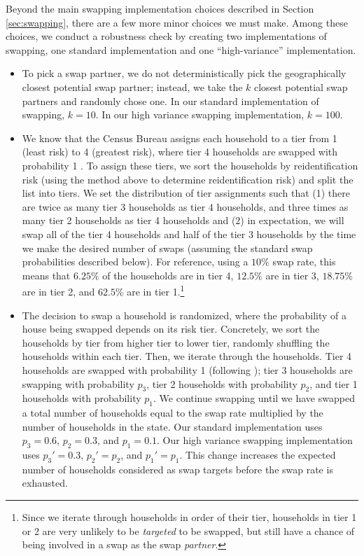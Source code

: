 Beyond the main swapping implementation choices described in Section \ref{sec:swapping}, there are a few more minor choices we must make. Among these choices, we conduct a robustness check by creating two implementations of swapping, one standard implementation and one ``high-variance'' implementation.
\begin{itemize}
    \item To pick a swap partner, we do not deterministically pick the geographically closest potential swap partner; instead, we take the $k$ closest potential swap partners and randomly chose one. In our standard implementation of swapping, $k=10$. In our high variance swapping implementation, $k=100$.
    \item We know that the Census Bureau assigns each household to a tier from 1 (least risk) to 4 (greatest risk), where tier 4 households are swapped with probability 1 \citep{steel-zayatz}. To assign these tiers, we sort the households by reidentification risk (using the method above to determine reidentification risk) and split the list into tiers. We set the distribution of tier assignments such that (1) there are twice as many tier 3 households as tier 4 households, and three times as many tier 2 households as tier 4 households and (2) in expectation, we will swap all of the tier 4 households and half of the tier 3 households by the time we make the desired number of swaps (assuming the standard swap probabilities described below). For reference, using a $10\%$ swap rate, this means that $6.25\%$ of the households are in tier 4, $12.5\%$ are in tier 3, $18.75\%$ are in tier 2, and $62.5\%$ are in tier 1.\footnote{Since we iterate through households in order of their tier, households in tier 1 or 2 are very unlikely to be \emph{targeted} to be swapped, but still have a chance of being involved in a swap as the swap \emph{partner}.}
    \item The decision to swap a household is randomized, where the probability of a house being swapped depends on its risk tier. Concretely, we sort the households by tier from higher tier to lower tier, randomly shuffling the households within each tier. Then, we iterate through the households. Tier 4 households are swapped with probability 1 (following \citet{steel-zayatz}); tier 3 households are swapping with probability $p_3$, tier 2 households with probability $p_2$, and tier 1 households with probability $p_1$. We continue swapping until we have swapped a total number of households equal to the swap rate multiplied by the number of households in the state.
    Our standard implementation uses $p_3 = 0.6$, $p_2 = 0.3$, and $p_1 = 0.1$. Our high variance swapping implementation uses $p_3'=0.3$, $p_2'=p_2$, and $p_1'=p_1$. This change increases the expected number of households considered as swap targets before the swap rate is exhausted.
\end{itemize}